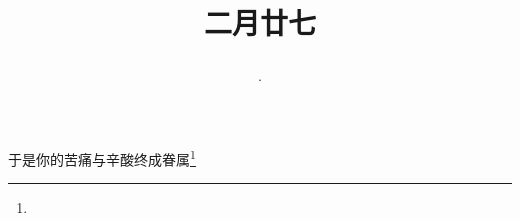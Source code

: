 \title{\date[d=5,m=4,y=2024][year:cn-y,年,month:cn,day:cn,日,·,weekday]·二月廿七 }
于是你的苦痛与辛酸终成眷属\footnote{ }

